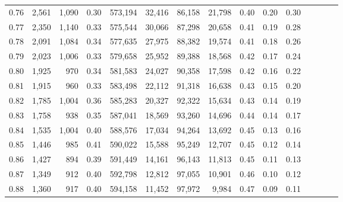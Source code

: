 \begin{tabular}{rrrcrrrrrrrrrrr}
0.76 &   2,561 &  1,090 &                                       0.30 &  573,194 &   32,416 &   86,158 &   21,798 &  0.40 &  0.20 &                         0.30 \\
0.77 &   2,350 &  1,140 &                                       0.33 &  575,544 &   30,066 &   87,298 &   20,658 &  0.41 &  0.19 &                         0.28 \\
0.78 &   2,091 &  1,084 &                                       0.34 &  577,635 &   27,975 &   88,382 &   19,574 &  0.41 &  0.18 &                         0.26 \\
0.79 &   2,023 &  1,006 &                                       0.33 &  579,658 &   25,952 &   89,388 &   18,568 &  0.42 &  0.17 &                         0.24 \\
0.80 &   1,925 &    970 &                                       0.34 &  581,583 &   24,027 &   90,358 &   17,598 &  0.42 &  0.16 &                         0.22 \\
0.81 &   1,915 &    960 &                                       0.33 &  583,498 &   22,112 &   91,318 &   16,638 &  0.43 &  0.15 &                         0.20 \\
0.82 &   1,785 &  1,004 &                                       0.36 &  585,283 &   20,327 &   92,322 &   15,634 &  0.43 &  0.14 &                         0.19 \\
0.83 &   1,758 &    938 &                                       0.35 &  587,041 &   18,569 &   93,260 &   14,696 &  0.44 &  0.14 &                         0.17 \\
0.84 &   1,535 &  1,004 &                                       0.40 &  588,576 &   17,034 &   94,264 &   13,692 &  0.45 &  0.13 &                         0.16 \\
0.85 &   1,446 &    985 &                                       0.41 &  590,022 &   15,588 &   95,249 &   12,707 &  0.45 &  0.12 &                         0.14 \\
0.86 &   1,427 &    894 &                                       0.39 &  591,449 &   14,161 &   96,143 &   11,813 &  0.45 &  0.11 &                         0.13 \\
0.87 &   1,349 &    912 &                                       0.40 &  592,798 &   12,812 &   97,055 &   10,901 &  0.46 &  0.10 &                         0.12 \\
0.88 &   1,360 &    917 &                                       0.40 &  594,158 &   11,452 &   97,972 &    9,984 &  0.47 &  0.09 &                         0.11 \\

\end{tabular}
